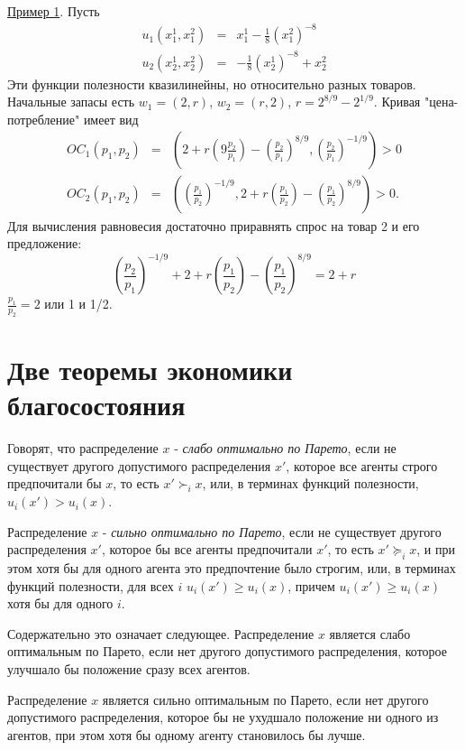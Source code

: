 \underline{Пример 1}. Пусть
\begin{eqnarray*}
u_1(x^1_1,x^2_1)&=&x^1_1-{\frac{1}{8}}(x^2_1)^{-8}\\
u_2(x^1_2,x^2_2)&=&-{\frac{1}{8}}(x^1_2)^{-8}+x^2_2
\end{eqnarray*}
Эти функции полезности квазилинейны, но относительно разных товаров. Начальные запасы
есть $w_1=(2,r)$, $w_2=(r,2)$, $r=2^{8/9}-2^{1/9}$. Кривая "цена-потребление" имеет вид
\begin{eqnarray*}
OC_1(p_1,p_2)&=&\left( 2+r\left( 9{\frac{p_2}{p_1}}\right
)-\left(\frac{p_2}{p_1}\right )^{8/9},
\left ({\frac{p_2}{p_1}}\right )^{-1/9}\right )>0\\
OC_2(p_1,p_2)&=&\left (\left ({\frac{p_1}{p_2}}\right
)^{-1/9},2+r\left ({\frac{p_1}{p_2}}\right )- \left
({\frac{p_1}{p_2}}\right )^{8/9}\right )>0.
\end{eqnarray*}
Для вычисления равновесия достаточно приравнять спрос на товар 2 и его предложение:
$$
\left ({\frac{p_2}{p_1}}\right )^{-1/9}+2+r\left
({\frac{p_1}{p_2}}\right )-\left ( {\frac{p_1}{p_2}}\right
)^{8/9}=2+r
$$
${\frac{p_1}{p_2}}=2$  или 1 и 1/2.

\section*{Две теоремы экономики благосостояния}

Говорят, что распределение $x$ - \emph{слабо  оптимально по Парето}, если
не существует другого допустимого распределения $x'$, которое все агенты
строго предпочитали бы $x$, то есть $x'\succ_i x$, или, в терминах
функций полезности, $u_i(x')>u_i(x)$.

Распределение $x$ - \emph{сильно оптимально по Парето}, если не существует
другого распределения $x'$, которое бы все агенты предпочитали $x'$,
то есть $x'\succcurlyeq_i x$, и при этом хотя бы для одного агента это
предпочтение было строгим, или, в терминах функций полезности,
для всех $i$ $u_i(x') \geq u_i(x)$, причем $u_i(x') \ge u_i(x)$ хотя бы для
одного $i$.

Содержательно это означает следующее. Распределение $x$ является
слабо оптимальным по Парето, если нет другого допустимого распределения,
которое улучшало бы положение сразу всех агентов.

Распределение $x$ является сильно оптимальным по Парето, если нет другого
допустимого распределения, которое бы не ухудшало положение ни одного из агентов,
при этом хотя бы одному агенту становилось бы лучше.

